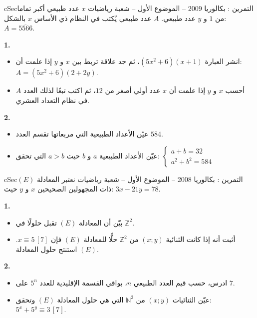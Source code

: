 \documentclass[12pt,a4paper]{article}
\newenvironment{BOX}[2]{\begin{otherlanguage}{english}\begin{arbox}{#1}{#2}}{\end{arbox}\end{otherlanguage}}
\newcounter{exo}
\newenvironment{tamrin}[1]{\stepcounter{exo}\begin{BOX}{cSec}{التمرين \theexo: #1}}{\end{BOX}}
\newcommand{\N}{\mathbb{N}}
\newcommand{\Z}{\mathbb{Z}}
\newenvironment{sq}{\begin{itemize}[leftmargin=2.4em,itemsep=3pt]}{\end{itemize}}
\newcommand{\qa}{\item[(أ)]}\newcommand{\qb}{\item[(ب)]}\newcommand{\qc}{\item[(جـ)]}\newcommand{\qd}{\item[(د)]}\newcommand{\qe}{\item[(هـ)]}
\begin{document}
\begin{tamrin}{بكالوريا 2009 -- الموضوع الأول -- شعبة رياضيات}
$x$ عدد طبيعي أكبر تماما من $1$ و $y$ عدد طبيعي. $A$ عدد طبيعي يُكتب في النظام ذي الأساس $x$ بالشكل: $A=\overline{5566}$.

\textbf{1.}
\begin{sq}
\qa انشر العبارة $\left(5x^2+6\right)(x+1)$، ثم جد علاقة تربط بين $x$ و $y$ إذا علمت أن: $A=\left(5x^2+6\right)(2+2y)$.
\qb أحسب $x$ و $y$ إذا علمت أن $x$ عدد أولي أصغر من $12$، ثم اكتب تبعًا لذلك العدد $A$ في نظام التعداد العشري.
\end{sq}
\textbf{2.}
\begin{sq}
\qa عيّن الأعداد الطبيعية التي مربعاتها تقسم العدد $584$.
\qb عيّن الأعداد الطبيعية $a$ و $b$ حيث $a>b$ التي تحقق: $\begin{cases}a+b=32\\ a^2+b^2=584\end{cases}$
\end{sq}
\end{tamrin}

\begin{tamrin}{بكالوريا 2008 -- الموضوع الأول -- شعبة رياضيات}
نعتبر المعادلة $(E)$ ذات المجهولين الصحيحين $x$ و $y$ حيث: $3x-21y=78$.

\textbf{1.}
\begin{sq}
\qa بيّن أن المعادلة $(E)$ تقبل حلولًا في $\Z^2$.
\qb أثبت أنه إذا كانت الثنائية $(x;y)$ من $\Z^2$ حلًّا للمعادلة $(E)$ فإن $x\equiv5\,[7]$. استنتج حلول المعادلة $(E)$.
\end{sq}
\textbf{2.}
\begin{sq}
\qa ادرس، حسب قيم العدد الطبيعي $n$، بواقي القسمة الإقليدية للعدد $5^n$ على $7$.
\qb عيّن الثنائيات $(x;y)$ من $\N^2$ التي هي حلول المعادلة $(E)$ وتحقق: $5^x+5^y\equiv3\,[7]$.
\end{sq}
\end{tamrin}
\end{document}
